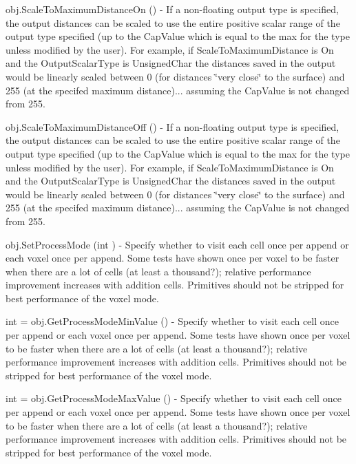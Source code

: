 \begin{DoxyItemize}
\item {\ttfamily obj.\-Scale\-To\-Maximum\-Distance\-On ()} -\/ If a non-\/floating output type is specified, the output distances can be scaled to use the entire positive scalar range of the output type specified (up to the Cap\-Value which is equal to the max for the type unless modified by the user). For example, if Scale\-To\-Maximum\-Distance is On and the Output\-Scalar\-Type is Unsigned\-Char the distances saved in the output would be linearly scaled between 0 (for distances \char`\"{}very close\char`\"{} to the surface) and 255 (at the specifed maximum distance)... assuming the Cap\-Value is not changed from 255.  
\item {\ttfamily obj.\-Scale\-To\-Maximum\-Distance\-Off ()} -\/ If a non-\/floating output type is specified, the output distances can be scaled to use the entire positive scalar range of the output type specified (up to the Cap\-Value which is equal to the max for the type unless modified by the user). For example, if Scale\-To\-Maximum\-Distance is On and the Output\-Scalar\-Type is Unsigned\-Char the distances saved in the output would be linearly scaled between 0 (for distances \char`\"{}very close\char`\"{} to the surface) and 255 (at the specifed maximum distance)... assuming the Cap\-Value is not changed from 255.  
\item {\ttfamily obj.\-Set\-Process\-Mode (int )} -\/ Specify whether to visit each cell once per append or each voxel once per append. Some tests have shown once per voxel to be faster when there are a lot of cells (at least a thousand?); relative performance improvement increases with addition cells. Primitives should not be stripped for best performance of the voxel mode.  
\item {\ttfamily int = obj.\-Get\-Process\-Mode\-Min\-Value ()} -\/ Specify whether to visit each cell once per append or each voxel once per append. Some tests have shown once per voxel to be faster when there are a lot of cells (at least a thousand?); relative performance improvement increases with addition cells. Primitives should not be stripped for best performance of the voxel mode.  
\item {\ttfamily int = obj.\-Get\-Process\-Mode\-Max\-Value ()} -\/ Specify whether to visit each cell once per append or each voxel once per append. Some tests have shown once per voxel to be faster when there are a lot of cells (at least a thousand?); relative performance improvement increases with addition cells. Primitives should not be stripped for best performance of the voxel mode.  

\end{DoxyItemize}
